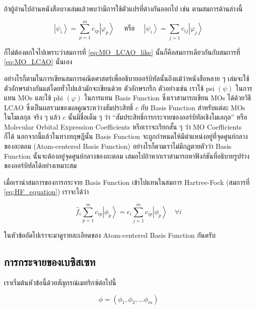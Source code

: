 \noindent ถ้าผู้อ่านไปอ่านหนังสือบางเล่มแล้วพบว่ามีการใช้ตัวแปรที่ต่างกันออกไป เช่น ตามสมการด้านล่างนี้

\begin{equation}
    \label{eq:MO_LCAO_like}
    \left|\psi_{i}\right\rangle
    =
    \sum_{p=1}^m c_{i p}\left|\varphi_{p}\right\rangle
    \quad \text{ หรือ } \quad
    \left|\psi_{i}\right\rangle
    =
    \sum_{j=1} c_{i j}\left|\varphi_{j}\right\rangle
\end{equation}

\noindent ก็ไม่ต้องตกใจไปเพราะว่าสมการที่ \ref{eq:MO_LCAO_like} นั้นก็คือสมการเดียวกันกับสมการที่ \ref{eq:MO_LCAO} นั่นเอง

อย่างไรก็ตามในการเขียนสมการคณิตศาสตร์เพื่ออธิบายออร์บิทัลนั้นถึงแม้ว่าหนังสือหลาย ๆ เล่มจะใช้ตัวอักษรต่างกันแต่โดยทั่วไปแล้วมักจะเขียนด้วย%
ตัวอักษรกรีก ตัวอย่างเช่น เราใช้ psi $(\psi)$ ในการแทน MOs และใช้ phi $(\varphi)$ ในการแทน Basis Function ซึ่งเราสามารถเขียน
MOs ได้ด้วยวิธี LCAO ซึ่งเป็นผลรวมของผลคูณระหว่างสัมประสิทธิ์ $c$ กับ Basis Function สำหรับแต่ละ MOs ในโมเลกุล จริง ๆ แล้ว $c$
นั้นมีชื่อเต็ม ๆ ว่า \enquote{สัมประสิทธิ์การกระจายของออร์บิทัลเชิงโมเลกุล} หรือ Molecular Orbital Expression Coefficients
หรือเราจะเรียกสั้น ๆ ว่า MO Coefficients ก็ได้ นอกจากนี้แล้วในทางทฤษฎีนั้น Basis Function จะถูกกำหนดให้มีตำแหน่งอยู่ที่จุดศูนย์กลาง%
ของอะตอม (Atom-centered Basis Function) อย่างไรก็ตามเราไม่มีกฎตายตัวว่า Basis Function นั้นจะต้องอยู่จุดศูนย์กลางของอะตอม%
เสมอไปถ้าหากเราสามารถหาฟังก์ชันที่อธิบายรูปร่างของออร์บิทัลได้อย่างเหมาะสม

เมื่อเรานำสมการของการกระจาย Basis Function เข้าไปแทนในสมการ Hartree-Fock (สมการที่ \ref{eq:HF_equation}) เราจะได้ว่า

\begin{equation}
    \label{eq:HF_equation_LCMO}
    \hat{f}_i \sum_{p=1}^m c_{i p}\left|\phi_p\right\rangle
    =
    \epsilon_i \sum_{j=1}^m c_{i p}\left|\phi_p\right\rangle \quad \forall i
\end{equation}

ในหัวข้อถัดไปเราจะมาดูรายละเอียดของ Atom-centered Basis Function กันครับ

\subsection{การกระจายของเบซิสเซท}

เราเริ่มต้นหัวข้อนี้ด้วยสัญกรณ์เมทริกซ์ต่อไปนี้

\begin{equation}
    \phi
    =
    \left(\phi_1, \phi_2, \dots \phi_m\right)
\end{equation}

